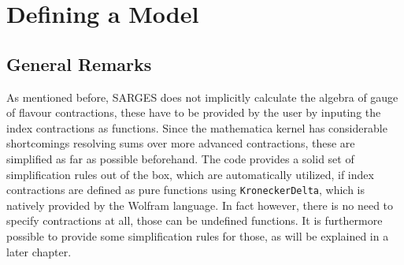 \documentclass{scrartcl}
\begin{document}
\section{Defining a Model}
\subsection{General Remarks}
As mentioned before, SARGES does not implicitly calculate the algebra of gauge of flavour contractions, these have to be provided by the user by inputing the index contractions as functions. Since the mathematica kernel has considerable shortcomings resolving sums over more advanced contractions, these are simplified as far as possible beforehand. The code provides a solid set of simplification rules out of the box, which are automatically utilized, if index contractions are defined as pure functions using \texttt{KroneckerDelta}, which is natively provided by the Wolfram language. In fact however, there is no need to specify contractions at all, those can be undefined functions. It is furthermore possible to provide some simplification rules for those, as will be explained in a later chapter.
\end{document}
